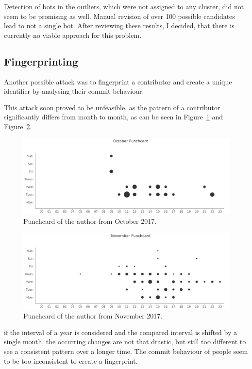 Detection of bots in the outliers, which were not assigned to any cluster, did not seem to be promising as well.
Manual revision of over 100 possible candidates lead to not a single bot.
After reviewing these results, I decided, that there is currently no viable approach for this problem.


\subsection{Fingerprinting}
Another possible attack was to fingerprint a contributor and create a unique identifier by analysing their commit behaviour.

This attack soon proved to be unfeasible, as the pattern of a contributor significantly differs from month to month, as can be seen in Figure~\ref{fig:october-punchcard} and Figure~\ref{fig:november-punchcard}.

\begin{figure}[H]
    \includegraphics[scale=0.32]{./graphs/analysis/october-punchcard}
    \centering
    \caption{Punchcard of the author from October 2017.}\label{fig:october-punchcard}
\end{figure}

\begin{figure}[H]
    \includegraphics[scale=0.32]{./graphs/analysis/november-punchcard}
    \centering
    \caption{Punchcard of the author from November 2017.}\label{fig:november-punchcard}
\end{figure}

if the interval of a year is considered and the compared interval is shifted by a single month, the occurring changes are not that drastic, but still too different to see a consistent pattern over a longer time.
The commit behaviour of people seem to be too inconsistent to create a fingerprint.
